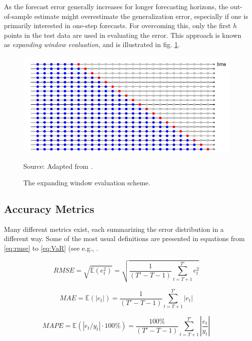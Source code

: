 As the forecast error generally increases for longer forecasting horizons, the out-of-sample estimate might overestimate the generalization error, especially if one is primarily interested in one-step forecasts.
For overcoming this, only the first $h$ points in the test data are used in evaluating the error.
This approach is known as \textit{expanding window evaluation}, and is illustrated in fig. \ref{fig:expanding_window_cv}.
\begin{figure}[H]%
   \centering
    \caption{The expanding window evaluation scheme.}
    \includegraphics[scale=0.8]{expanding_window_cv.png} \\
    \raggedright
    Source: Adapted from \cite{krispin2019handson}.
   \label{fig:expanding_window_cv}
\end{figure}


\subsection{Accuracy Metrics}\label{subsec:metrics}
Many different metrics exist, each summarizing the error distribution in a different way.
Some of the most usual definitions are presented in equations from \ref{eq:rmse} to \ref{eq:VaR} (see e.g., \cite{wu2019graphwavenet, liu2019st-mgcn, hyndman2006metrics, artzner1999coherent}.

\begin{equation}\label{eq:rmse}
    RMSE = \sqrt{\mathbb{E}(e_t^2)} = \sqrt{\frac{1}{(T'-T-1)}\sum_{t=T+1}^{T'} e^2_t}
\end{equation}

\begin{equation}\label{eq:mae}
    MAE = \mathbb{E}(|e_t|) = \frac{1}{(T'-T-1)}\sum_{t=T+1}^{T'} |e_t|
\end{equation}

\begin{equation}\label{eq:mape}
    MAPE = \mathbb{E}(|e_t/y_t|\cdot 100\%) = \frac{100\%}{(T'-T-1)}\sum_{t=T+1}^{T'} \left|\frac{e_t}{y_t}\right|
\end{equation}

